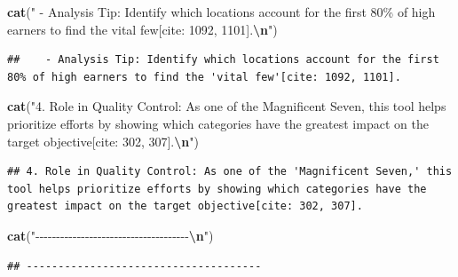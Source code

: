 \documentclass[
]{article}
\newenvironment{Shaded}{\begin{snugshade}}{\end{snugshade}}
\newcommand{\FunctionTok}[1]{\textcolor[rgb]{0.13,0.29,0.53}{\textbf{#1}}}
\newcommand{\NormalTok}[1]{#1}
\newcommand{\SpecialCharTok}[1]{\textcolor[rgb]{0.81,0.36,0.00}{\textbf{#1}}}
\newcommand{\StringTok}[1]{\textcolor[rgb]{0.31,0.60,0.02}{#1}}
\begin{document}
\begin{Shaded}
\begin{Highlighting}[]
\FunctionTok{cat}\NormalTok{(}\StringTok{"   {-} Analysis Tip: Identify which locations account for the first 80\% of high earners to find the \textquotesingle{}vital few\textquotesingle{}[cite: 1092, 1101].}\SpecialCharTok{\textbackslash{}n}\StringTok{"}\NormalTok{)}
\end{Highlighting}
\end{Shaded}

\begin{verbatim}
##    - Analysis Tip: Identify which locations account for the first 80% of high earners to find the 'vital few'[cite: 1092, 1101].
\end{verbatim}

\begin{Shaded}
\begin{Highlighting}[]
\FunctionTok{cat}\NormalTok{(}\StringTok{"4. Role in Quality Control: As one of the \textquotesingle{}Magnificent Seven,\textquotesingle{} this tool helps prioritize efforts by showing which categories have the greatest impact on the target objective[cite: 302, 307].}\SpecialCharTok{\textbackslash{}n}\StringTok{"}\NormalTok{)}
\end{Highlighting}
\end{Shaded}

\begin{verbatim}
## 4. Role in Quality Control: As one of the 'Magnificent Seven,' this tool helps prioritize efforts by showing which categories have the greatest impact on the target objective[cite: 302, 307].
\end{verbatim}

\begin{Shaded}
\begin{Highlighting}[]
\FunctionTok{cat}\NormalTok{(}\StringTok{"{-}{-}{-}{-}{-}{-}{-}{-}{-}{-}{-}{-}{-}{-}{-}{-}{-}{-}{-}{-}{-}{-}{-}{-}{-}{-}{-}{-}{-}{-}{-}{-}{-}{-}{-}{-}{-}}\SpecialCharTok{\textbackslash{}n}\StringTok{"}\NormalTok{)}
\end{Highlighting}
\end{Shaded}

\begin{verbatim}
## -------------------------------------
\end{verbatim}
\end{document}
